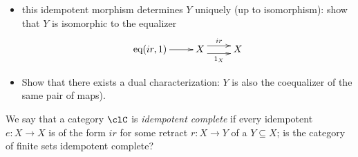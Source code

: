 \documentclass[11pt]{article}
\begin{document}
\begin{enumerate}
	\begin{itemize} 
		\item this idempotent morphism determines $Y$ uniquely (up to isomorphism): show that $Y$ is isomorphic to the equalizer 
		\[
		\xymatrix{\text{eq}(ir,1) \ar[r] & X \ar@<4pt>[r]^{ir} \ar@< -4pt>[r]_{1_X} & X}	
		\]
    \item Show that there exists a dual characterization: $Y$ is also the coequalizer of the same pair of maps).
	\end{itemize}
	We say that a category $\clC$ is \emph{idempotent complete} if every idempotent $e : X \to X$ is of the form $ir$ for some retract $r : X \to Y$ of a $Y\subseteq X$; is the category of finite sets idempotent complete?
\end{enumerate}
\end{document}
